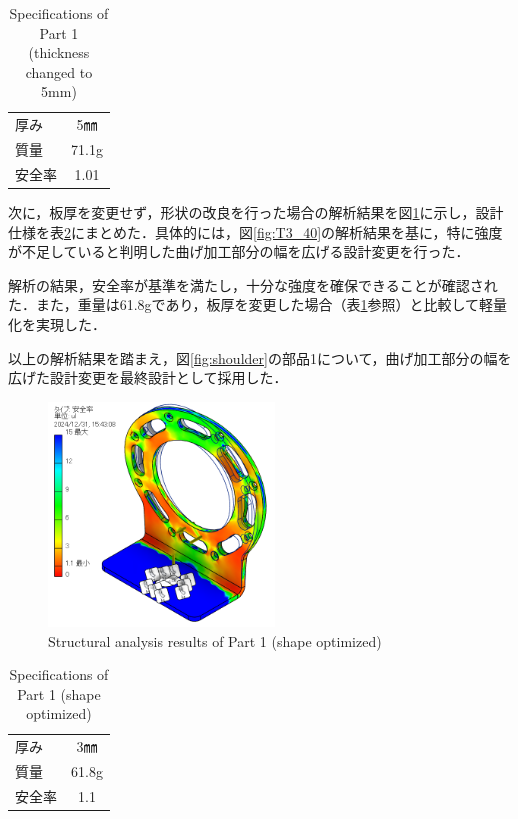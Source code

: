 \begin{table}[h]
  \centering
  \caption{Specifications of Part 1 (thickness changed to 5mm)}
  \begin{tabular}{lc}
    \hline
    厚み & 5㎜ \\ 
    質量 & 71.1g \\ 
    安全率 & 1.01 \\ \hline
  \end{tabular}
  \label{tab:part1_spec_T5}
\end{table}
\clearpage

次に，板厚を変更せず，形状の改良を行った場合の解析結果を図\ref{fig:T3_80}に示し，設計仕様を表\ref{tab:part1_spec_T3_80}にまとめた．具体的には，図\ref{fig:T3_40}の解析結果を基に，特に強度が不足していると判明した曲げ加工部分の幅を広げる設計変更を行った．

解析の結果，安全率が基準を満たし，十分な強度を確保できることが確認された．また，重量は61.8gであり，板厚を変更した場合（表\ref{tab:part1_spec_T5}参照）と比較して軽量化を実現した．

以上の解析結果を踏まえ，図\ref{fig:shoulder}の部品1について，曲げ加工部分の幅を広げた設計変更を最終設計として採用した．

\begin{figure}[h]
  \centering
  \includegraphics[width=6cm]{images/design/T3_80.png}
  \caption{Structural analysis results of Part 1 (shape optimized)}
  \label{fig:T3_80}
\end{figure}

\begin{table}[h]
  \centering
  \caption{Specifications of Part 1 (shape optimized)}
  \begin{tabular}{lc}
    \hline
    厚み & 3㎜ \\ 
    質量 & 61.8g \\ 
    安全率 & 1.1 \\ \hline
  \end{tabular}
  \label{tab:part1_spec_T3_80}
\end{table}

